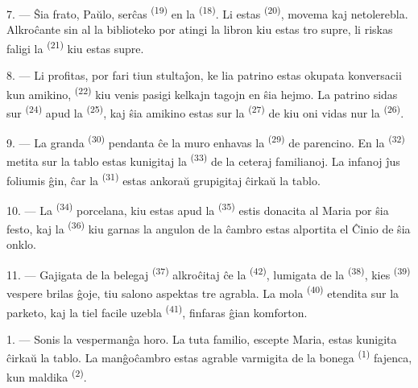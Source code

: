 \VUsaut{5.0mm}
\VUsaut{3.0mm}

7. --- Ŝia frato, Paŭlo, serĉas  \textsuperscript{(19)} en la
 \textsuperscript{(18)}. Li estas 
\textsuperscript{(20)}, movema kaj netolerebla. Alkroĉante sin al la
biblioteko por atingi la libron kiu estas tro supre, li riskas faligi la
 \textsuperscript{(21)} kiu estas supre.

8. --- Li profitas, por fari tiun stultaĵon, ke lia patrino estas okupata
konversacii kun amikino,  \textsuperscript{(22)} kiu venis
pasigi kelkajn tagojn en ŝia hejmo. La patrino sidas sur 
\textsuperscript{(24)} apud la  \textsuperscript{(25)}, kaj
ŝia amikino estas sur la  \textsuperscript{(27)} de kiu oni vidas
nur la  \textsuperscript{(26)}.

9. --- La granda  \textsuperscript{(30)} pendanta ĉe la muro
enhavas la  \textsuperscript{(29)} de parencino. En la
 \textsuperscript{(32)} metita sur la tablo estas kunigitaj la
 \textsuperscript{(33)} de la ceteraj familianoj. La
infanoj ĵus foliumis ĝin, ĉar la  \textsuperscript{(31)} estas
ankoraŭ grupigitaj ĉirkaŭ la tablo.

10. --- La  \textsuperscript{(34)} porcelana, kiu estas apud
la  \textsuperscript{(35)} estis donacita al Maria por
ŝia festo, kaj la  \textsuperscript{(36)} kiu garnas la
angulon de la ĉambro estas alportita el Ĉinio de ŝia onklo.

11. --- Gajigata de la belegaj  \textsuperscript{(37)}
alkroĉitaj ĉe la  \textsuperscript{(42)}, lumigata de la
 \textsuperscript{(38)}, kies 
\textsuperscript{(39)} vespere brilas ĝoje, tiu salono aspektas tre agrabla. La
mola  \textsuperscript{(40)} etendita sur la parketo, kaj la tiel
facile uzebla  \textsuperscript{(41)}, finfaras ĝian
komforton.

\VUsaut{3.6mm}
\VUsaut{3.0mm}

1. --- Sonis la vespermanĝa horo. La tuta familio, escepte Maria, estas
kunigita ĉirkaŭ la tablo. La manĝoĉambro estas agrable varmigita de la bonega
 \textsuperscript{(1)} fajenca, kun maldika 
\textsuperscript{(2)}.

